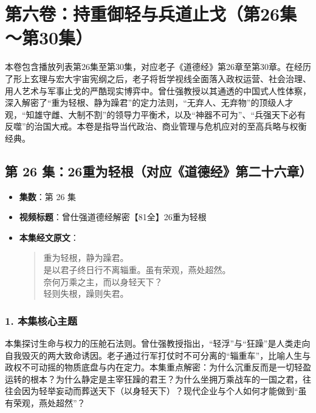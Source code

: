 \section*{第六卷：持重御轻与兵道止戈（第26集～第30集）}

本卷包含播放列表第26集至第30集，对应老子《道德经》第26章至第30章。在经历了形上玄理与宏大宇宙宪纲之后，老子将哲学视线全面落入政权运营、社会治理、用人艺术与军事止戈的严酷现实博弈中。曾仕强教授以其通透的中国式人性体察，深入解密了“重为轻根、静为躁君”的定力法则，“无弃人、无弃物”的顶级人才观，“知雄守雌、大制不割”的领导力平衡术，以及“神器不可为”、“兵强天下必有反噬”的治国大戒。本卷是指导当代政治、商业管理与危机应对的至高兵略与权衡经典。

\clearpage

\subsection{第 26 集：26重为轻根（对应《道德经》第二十六章）}
\label{sec:ep26}

\begin{itemize}
    \item \textbf{集数}：第 26 集
    \item \textbf{视频标题}：曾仕强道德经解密【81全】26重为轻根
    
    \item \textbf{本集经文原文}：
    \begin{quote}\kaishu
    重为轻根，静为躁君。\\
    是以君子终日行不离辎重。虽有荣观，燕处超然。\\
    奈何万乘之主，而以身轻天下？\\
    轻则失根，躁则失君。
    \end{quote}
\end{itemize}

\subsubsection{1. 本集核心主题}
本集探讨生命与权力的压舱石法则。曾仕强教授指出，“轻浮”与“狂躁”是人类走向自我毁灭的两大致命诱因。老子通过行军打仗时不可分离的“辎重车”，比喻人生与政权不可动摇的物质底盘与内在定力。本集重点解密：为什么沉重反而是一切轻盈运转的根本？为什么静定是主宰狂躁的君王？为什么坐拥万乘战车的一国之君，往往会因为轻举妄动而葬送天下（以身轻天下）？现代企业与个人如何才能做到“虽有荣观，燕处超然”？

